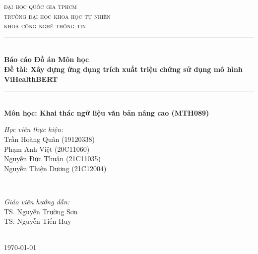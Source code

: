 \documentclass[12pt]{article}
\newcommand{\coursename}{Khai thác ngữ liệu văn bản nâng cao (MTH089)}
\newcommand{\reportname}{Xây dựng ứng dụng trích xuất triệu chứng sử dụng mô hình ViHealthBERT}
\begin{document}
\begin{titlepage}
\newcommand{\HRule}{\rule{\linewidth}{0.5mm}}
\centering

\textsc{\LARGE đại học quốc gia tphcm}\\[1.5cm]
\textsc{\Large trường đại học khoa học tự nhiên}\\[0.5cm]
\textsc{\large khoa công nghệ thông tin}\\[0.5cm]

\HRule \\[0.4cm]
{ 
\huge{\bfseries{Báo cáo Đồ án Môn học}}\\[0.5cm]
\large{\bfseries{Đề tài: \reportname}}
}\\[0.4cm]
\HRule \\[0.5cm]

\textbf{\large Môn học: \coursename}\\[0.5cm]

\begin{minipage}[t]{0.4\textwidth}
\begin{flushleft} \large
\emph{Học viên thực hiện:}\\
Trần Hoàng Quân (19120338) \\
Phạm Anh Việt \textsc{(20C11060)} \\
Nguyễn Đức Thuận \textsc{(21C11035)} \\
Nguyễn Thiện Dương \textsc{(21C12004)} \\
\end{flushleft}
\end{minipage}
~
\begin{minipage}[t]{0.4\textwidth}
\begin{flushright} \large
\emph{Giáo viên hướng dẫn:} \\
TS. Nguyễn Trường Sơn\\
TS. Nguyễn Tiến Huy
\end{flushright}
\end{minipage}\\[1cm]

{\large \today}\\[1cm]


\end{titlepage}
\end{document}
